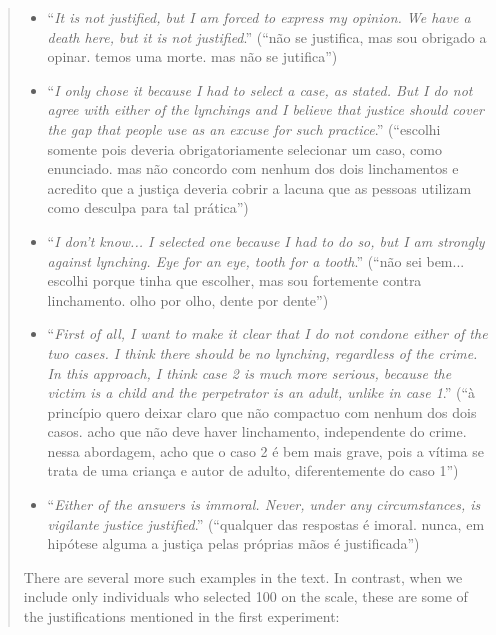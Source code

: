 \documentclass[a4paper,12pt]{article}
\begin{document}
\begin{quote}
\begin{itemize}
  \item ``\textit{It is not justified, but I am forced to express my opinion. We have a death here, but it is not justified}.'' (``não se justifica, mas sou obrigado a opinar. temos uma morte. mas não se jutifica'') 
  \item ``\textit{I only chose it because I had to select a case, as stated. But I do not agree with either of the lynchings and I believe that justice should cover the gap that people use as an excuse for such practice}.'' (``escolhi somente pois deveria obrigatoriamente selecionar um caso, como enunciado. mas não concordo com nenhum dos dois linchamentos e acredito que a justiça deveria cobrir a lacuna que as pessoas utilizam como desculpa para tal prática'')
  \item ``\textit{I don't know... I selected one because I had to do so, but I am strongly against lynching. Eye for an eye, tooth for a tooth}.'' (``não sei bem... escolhi porque tinha que escolher, mas sou fortemente contra linchamento. olho por olho, dente por dente'')
  \item ``\textit{First of all, I want to make it clear that I do not condone either of the two cases. I think there should be no lynching, regardless of the crime. In this approach, I think case 2 is much more serious, because the victim is a child and the perpetrator is an adult, unlike in case 1}.'' (``à princípio quero deixar claro que não compactuo com nenhum dos dois casos. acho que não deve haver linchamento, independente do crime. nessa abordagem, acho que o caso 2 é bem mais grave, pois a vítima se trata de uma criança e autor de adulto, diferentemente do caso 1'')
  \item ``\textit{Either of the answers is immoral. Never, under any circumstances, is vigilante justice justified}.'' (``qualquer das respostas é imoral. nunca, em hipótese alguma a justiça pelas próprias mãos é justificada'')

\end{itemize}

There are several more such examples in the text. In contrast, when we include
only individuals who selected 100 on the scale, these are some of the
justifications mentioned in the first experiment:


\end{quote}
\end{document}
